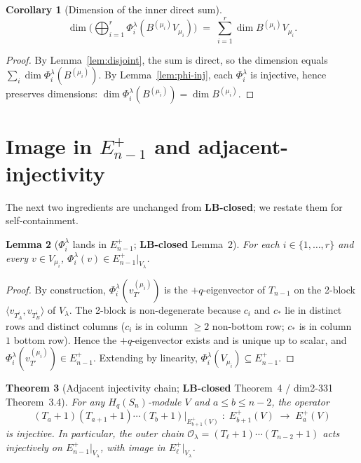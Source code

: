 \documentclass[11pt]{article}
\newtheorem{theorem}{Theorem}
\newtheorem{lemma}[theorem]{Lemma}
\newtheorem{corollary}[theorem]{Corollary}
\theoremstyle{definition}
\begin{document}
\begin{corollary}[Dimension of the inner direct sum]
\label{cor:inner-dim}
\[
   \dim \Big( \bigoplus_{i=1}^r \Phi_i^\lambda(B^{(\mu_i)} V_{\mu_i}) \Big)
   \;=\; \sum_{i=1}^r \dim B^{(\mu_i)} V_{\mu_i}.
\]
\end{corollary}

\begin{proof}
By Lemma~\ref{lem:disjoint}, the sum is direct, so the dimension
equals $\sum_i \dim \Phi_i^\lambda(B^{(\mu_i)})$. By
Lemma~\ref{lem:phi-inj}, each $\Phi_i^\lambda$ is injective, hence
preserves dimensions: $\dim \Phi_i^\lambda(B^{(\mu_i)}) = \dim B^{(\mu_i)}$.
\end{proof}

\section{Image in $E_{n-1}^+$ and adjacent-injectivity}\label{sec:eplus-adj}

The next two ingredients are unchanged from \textbf{LB-closed}; we
restate them for self-containment.

\begin{lemma}[$\Phi_i^\lambda$ lands in $E_{n-1}^+$;
\textbf{LB-closed} Lemma~2]\label{lem:image-Eplus}
For each $i \in \{1, \ldots, r\}$ and every $v \in V_{\mu_i}$,
$\Phi_i^\lambda(v) \in E_{n-1}^+|_{V_\lambda}$.
\end{lemma}

\begin{proof}
By construction, $\Phi_i^\lambda(v_{T'}^{(\mu_i)})$ is the
$+q$-eigenvector of $T_{n-1}$ on the 2-block $\langle v_{T_A^i},
v_{T_B^i}\rangle$ of $V_\lambda$. The 2-block is non-degenerate
because $c_i$ and $c_*$ lie in distinct rows and distinct columns
($c_i$ is in column $\ge 2$ non-bottom row; $c_*$ is in column $1$
bottom row). Hence the $+q$-eigenvector exists and is unique up to
scalar, and $\Phi_i^\lambda(v_{T'}^{(\mu_i)}) \in E_{n-1}^+$.
Extending by linearity, $\Phi_i^\lambda(V_{\mu_i}) \subseteq E_{n-1}^+$.
\end{proof}

\begin{theorem}[Adjacent injectivity chain;
\textbf{LB-closed} Theorem~4 / dim2-331 Theorem~3.4]\label{thm:adj-inj}
For any $H_q(S_n)$-module $V$ and $a \le b \le n-2$, the operator
\[
   (T_a{+}1)(T_{a+1}{+}1)\cdots(T_b{+}1) \big|_{E_{b+1}^+(V)}
   \;:\;
   E_{b+1}^+(V) \;\longrightarrow\; E_a^+(V)
\]
is injective. In particular, the outer chain
$\mathcal{O}_\lambda = (T_\ell{+}1)\cdots(T_{n-2}{+}1)$ acts
injectively on $E_{n-1}^+|_{V_\lambda}$, with image in
$E_\ell^+|_{V_\lambda}$.
\end{theorem}
\end{document}
